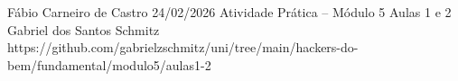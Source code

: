 \documentclass{article}
\begin{document}
{Fábio Carneiro de Castro}
{24/02/2026}
{Atividade Prática -- Módulo 5}
{Aulas 1 e 2}
{Gabriel dos Santos Schmitz}
{https://github.com/gabrielzschmitz/uni/tree/main/hackers-do-bem/fundamental/modulo5/aulas1-2}




\newpage
\printbibliography[title=Referências]
\end{document}
